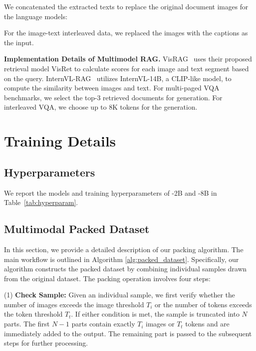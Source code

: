 We concatenated the extracted texts to replace the original document images for the language models:
\vspace{-2ex}

For the image-text interleaved data, we replaced the images with the captions as the input.


\noindent\textbf{Implementation Details of Multimodel RAG.}
VisRAG~\cite{yu2024visrag} uses their proposed retrieval model VisRet to calculate scores for each image and text segment based on the query. InternVL-RAG~\cite{wang2024needle} utilizes InternVL-14B, a CLIP-like model, to compute the similarity between images and text. For multi-paged VQA benchmarks, we select the top-3 retrieved documents for generation. For interleaved VQA, we choose up to 8K tokens for the generation.


\section{Training Details}
\subsection{Hyperparameters}
We report the models and training hyperparameters of \modelname-2B and \modelname-8B in Table~\ref{tab:hyperparam}.



\subsection{Multimodal Packed Dataset}

In this section, we provide a detailed description of our packing algorithm. The main workflow is outlined in Algorithm \ref{alg:packed_dataset}. Specifically, our algorithm constructs the packed dataset by combining individual samples drawn from the original dataset. The packing operation involves four steps:

(1) \textbf{Check Sample:} Given an individual sample, we first verify whether the number of images exceeds the image threshold $T_i$ or the number of tokens exceeds the token threshold $T_t$. If either condition is met, the sample is truncated into $N$ parts. The first $N-1$ parts contain exactly $T_i$ images or $T_t$ tokens and are immediately added to the output. The remaining part is passed to the subsequent steps for further processing.

